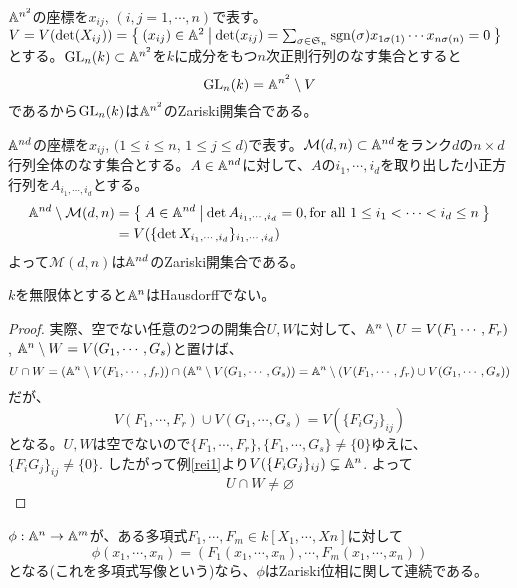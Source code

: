 \documentclass{ltjsreport}
\begin{document}
\begin{eg}
  $\mathbb{A}^{n^2}$の座標を$x_{ij}$, $(i,j=1,\cdots,n)$で表す。\\$V=V(\det (X_{ij}))=\left\{\:(x_{ij})\in\mathbb{A}^2\:\middle|\:\det(x_{ij})=\sum_{\sigma\in\mathfrak{S}_n}\mathrm{sgn}(\sigma)x_{1\sigma(1)}\cdots x_{n\sigma(n)}=0\:\right\}$とする。$\text{GL}_n(k)\subset \mathbb{A}^{n^2}$を$k$に成分をもつ$n$次正則行列のなす集合とすると
  \[
  \text{GL}_n(k)=\mathbb{A}^{n^2}\setminus V  
  \]
  であるから$\text{GL}_n(k)$は$\mathbb{A}^{n^2}$のZariski開集合である。
\end{eg}

\begin{eg}\label{M_d,n}
  $\mathbb{A}^{nd}$の座標を$x_{ij}$, $(1\leq i\leq n$, $1\leq j\leq d)$で表す。$\mathcal{M}(d,n)\subset\mathbb{A}^{nd}$をランク$d$の$n\times d$行列全体のなす集合とする。$A\in\mathbb{A}^{nd}$に対して、$A$の$i_1,\cdots,i_d$を取り出した小正方行列を$A_{i_1,\cdots,i_d}$とする。
  \begin{align*}
  \mathbb{A}^{nd}\setminus \mathcal{M}(d,n)
  &=\left\{\:A\in\mathbb{A}^{nd}\:\middle|\:\det A_{i_1,\cdots,i_d}=0, \text{for all $1\leq i_1<\cdots<i_d\leq n$}\:\right\}\\
  &=V(\{\det X_{i_1,\cdots,i_d}\}_{i_1,\cdots,i_d})
  \end{align*}
  よって$\mathcal{M}(d,n)$は$\mathbb{A}^{nd}$のZariski開集合である。
\end{eg}

\begin{prop}
  $k$を無限体とすると$\mathbb{A}^n$はHausdorffでない。
\end{prop}

\begin{proof}
  実際、空でない任意の2つの開集合$U,W$に対して、$\mathbb{A}^n\setminus U=V(F_1\cdots,F_r)$, $\mathbb{A}^n\setminus W=V(G_1,\cdots,G_s)$と置けば、
  \[
  U\cap W=(\mathbb{A}^n \setminus V(F_1,\cdots,f_r))\cap (\mathbb{A}^n \setminus V(G_1,\cdots,G_s))=\mathbb{A}^n\setminus(V(F_1,\cdots,f_r)\cup V(G_1,\cdots,G_s))  
  \]
  だが、
  \[
    V(F_1,\cdots,F_r)\cup V(G_1,\cdots,G_s)=V(\{F_iG_j\}_{ij}) 
  \]
  となる。$U,W$は空でないので$\{F_1,\cdots,F_r\},\{F_1,\cdots,G_s\}\neq \{0\}$ゆえに、$\{F_iG_j\}_{ij}\neq \{0\}$. したがって例\ref{rei1}より$V(\{F_iG_j\}_{ij})\subsetneq \mathbb{A}^n$. よって
  \[
  U\cap W\neq \varnothing
  \]
\end{proof}

\begin{prop}\label{continuity}
  $\phi:\mathbb{A}^n\rightarrow \mathbb{A}^m$が、ある多項式$F_1,\cdots,F_m\in k[X_1,\cdots,Xn]$に対して
  \[
  \phi(x_1,\cdots,x_n)=(F_1(x_1,\cdots,x_n),\cdots,F_m(x_1,\cdots,x_n))  
  \]
  となる(これを多項式写像という)なら、$\phi$はZariski位相に関して連続である。
\end{prop}
\end{document}
